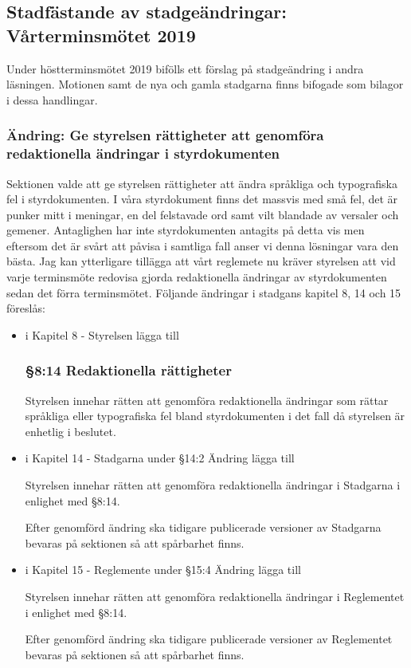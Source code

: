 \documentclass[10pt]{article}
\begin{document}
    \newpage

    \subsection*{Stadfästande av stadgeändringar: Vårterminsmötet 2019}
        Under höstterminsmötet 2019 bifölls ett förslag på stadgeändring i andra läsningen. Motionen samt de nya och gamla stadgarna finns bifogade som bilagor i dessa handlingar.

    \subsubsection*{Ändring: Ge styrelsen rättigheter att genomföra redaktionella ändringar i styrdokumenten}
      Sektionen valde att ge styrelsen rättigheter att ändra språkliga och typografiska fel i styrdokumenten. I våra styrdokument finns det massvis med små fel, det är punker mitt i meningar, en del felstavade ord samt vilt blandade av versaler och gemener. Antaglighen har inte styrdokumenten antagits på detta vis men eftersom det är svårt att påvisa i samtliga fall anser vi denna lösningar vara den bästa. Jag kan ytterligare tillägga att vårt reglemete nu kräver styrelsen att vid varje terminsmöte redovisa gjorda redaktionella ändringar av styrdokumenten sedan det förra terminsmötet. Följande ändringar i stadgans kapitel 8, 14 och 15 föreslås: 
    
    \begin{itemize}

    \item i Kapitel 8 - Styrelsen lägga till

    \subsubsection*{§8:14 Redaktionella rättigheter}
    
    Styrelsen innehar rätten att genomföra redaktionella ändringar som rättar språkliga eller typografiska fel bland styrdokumenten i det fall då styrelsen är enhetlig i beslutet. 

    \item i  Kapitel 14 - Stadgarna under §14:2 Ändring lägga till 
    
    Styrelsen innehar rätten att genomföra redaktionella ändringar i Stadgarna i enlighet med §8:14.
    
    Efter genomförd ändring ska tidigare publicerade versioner av Stadgarna bevaras på sektionen så att spårbarhet finns.

    \item i  Kapitel 15 - Reglemente under §15:4 Ändring lägga till 
    
    Styrelsen innehar rätten att genomföra redaktionella ändringar i Reglementet i enlighet med §8:14.
    
    Efter genomförd ändring ska tidigare publicerade versioner av Reglementet bevaras på sektionen så att spårbarhet finns.
 
      \end{itemize}
\end{document}
